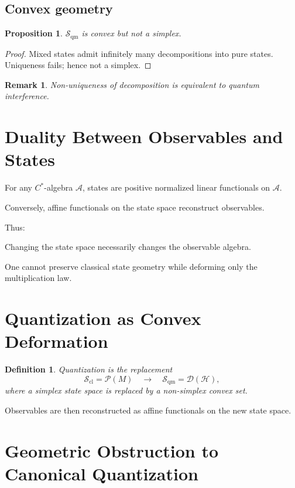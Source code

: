\documentclass[11pt]{article}
\newtheorem{definition}{Definition}
\newtheorem{proposition}{Proposition}
\newtheorem{remark}{Remark}
\begin{document}
\subsection{Convex geometry}

\begin{proposition}
$\mathcal{S}_{\mathrm{qm}}$ is convex but not a simplex.
\end{proposition}

\begin{proof}
Mixed states admit infinitely many decompositions into pure states.
Uniqueness fails; hence not a simplex.
\end{proof}

\begin{remark}
Non-uniqueness of decomposition is equivalent to quantum interference.
\end{remark}

\section{Duality Between Observables and States}

For any $C^*$-algebra $\mathcal{A}$,
states are positive normalized linear functionals on $\mathcal{A}$.

Conversely, affine functionals on the state space reconstruct observables.

Thus:

\begin{center}
Changing the state space necessarily changes the observable algebra.
\end{center}

One cannot preserve classical state geometry while deforming
only the multiplication law.

\section{Quantization as Convex Deformation}

\begin{definition}
Quantization is the replacement
\[
\mathcal{S}_{\mathrm{cl}} = \mathcal{P}(M)
\quad \longrightarrow \quad
\mathcal{S}_{\mathrm{qm}} = \mathcal{D}(\mathcal{H}),
\]
where a simplex state space is replaced by a non-simplex convex set.
\end{definition}

Observables are then reconstructed as affine functionals
on the new state space.

\section{Geometric Obstruction to Canonical Quantization}
\end{document}

